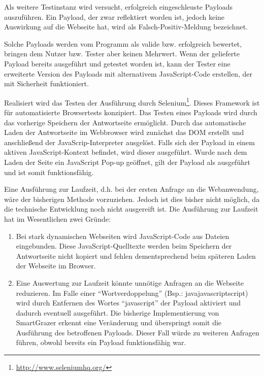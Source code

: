 Als weitere Testinstanz wird versucht, erfolgreich eingeschleuste Payloads auszuführen. Ein Payload, der zwar reflektiert worden ist, jedoch keine Auswirkung auf die Webseite hat, wird als Falsch-Positiv-Meldung bezeichnet.

Solche Payloads werden vom Programm als valide bzw. erfolgreich bewertet, bringen dem Nutzer bzw. Tester aber keinen Mehrwert. Wenn der gelieferte Payload bereits ausgeführt und getestet worden ist, kann der Tester eine erweiterte Version des Payloads mit alternativem JavaScript-Code erstellen, der mit Sicherheit funktioniert.

Realisiert wird das Testen der Ausführung durch Selenium\footnote{\url{http://www.seleniumhq.org/}}. Dieses Framework ist für automatisierte Browsertests konzipiert. Das Testen eines Payloads wird durch das vorherige Speichern der Antwortseite ermöglicht. Durch das automatische Laden der Antwortseite im Webbrowser wird zunächst das \ac{DOM} erstellt und anschließend der JavaScrip-Interpreter ausgelöst. Falls sich der Payload in einem aktiven JavaScript-Kontext befindet, wird dieser ausgeführt. Wurde nach dem Laden der Seite ein JavaScript Pop-up geöffnet, gilt der Payload als ausgeführt und ist somit funktionsfähig.

Eine Ausführung zur Laufzeit, d.h. bei der ersten Anfrage an die Webanwendung, wäre der bisherigen Methode vorzuziehen. Jedoch ist dies bisher nicht möglich, da die technische Entwicklung noch nicht ausgereift ist.
Die Ausführung zur Laufzeit hat im Wesentlichen zwei Gründe:

\begin{enumerate}
	\item Bei stark dynamischen Webseiten wird JavaScript-Code aus Dateien eingebunden. Diese JavaScript-Quelltexte werden beim Speichern der Antwortseite nicht kopiert und fehlen dementsprechend beim späteren Laden der Webseite im Browser.
	\item Eine Auswertung zur Laufzeit könnte unnötige Anfragen an die Webseite reduzieren. Im Falle einer ``Wortverdoppelung'' (Bsp.: javajavascriptscript) wird durch Entfernen des Wortes ``javascript'' der Payload aktiviert und dadurch eventuell ausgeführt. Die bisherige Implementierung von SmartGrazer erkennt eine Veränderung und überspringt somit die Ausführung des betroffenen Payloads.
	Dieser Fall würde zu weiteren Anfragen führen, obwohl bereits ein Payload funktionsfähig war.
\end{enumerate}
